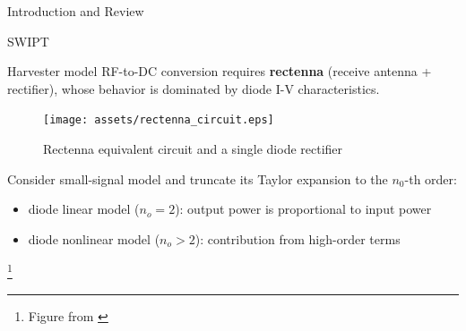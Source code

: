 \documentclass[9pt]{beamer}
\newcommand\blfootnote[1]{%
\begingroup
\renewcommand\thefootnote{}\footnote{#1}%
\addtocounter{footnote}{-1}%
\endgroup
}
\begin{document}
\begin{section}{Introduction and Review}
\begin{subsection}{SWIPT}
		\begin{frame}{Harvester model}
			RF-to-DC conversion requires \textbf{rectenna} (receive antenna + rectifier), whose behavior is dominated by diode I-V characteristics.
			\begin{figure}
				\centering
				\texttt{[image: assets/rectenna\_circuit.eps]}
				\caption{Rectenna equivalent circuit and a single diode rectifier \cite{Clerckx2018a}}
			\end{figure}
			Consider small-signal model and truncate its Taylor expansion to the $n_0$-th order:
			\begin{itemize}
				\item diode linear model (${n_o} = 2$): output power is proportional to input power
				\item \alert{diode nonlinear model} (${n_o} > 2$): contribution from high-order terms
			\end{itemize}
			\blfootnote{Figure from \cite{Clerckx2019}}
		\end{frame}


\end{subsection}
\end{section}
\end{document}

